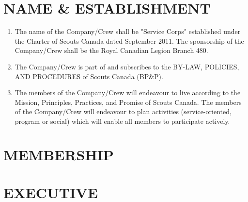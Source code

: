 \documentclass{Service_Corps_Document}
\begin{document}
    \def \Title {Constitution}
    \def \Company {Service Corps}
    \def \versionNumber {4.3}
    \stdFooter
    \begin{titlepage}
        \stdTitlePage
    \end{titlepage}

    \tableofcontents

    \newpage


    \section{NAME \& ESTABLISHMENT}\label{sec:name-&-establishment}
    \begin{enumerate}
        \item The name of the Company/Crew shall be "Service Corps" established under the Charter of Scouts Canada dated September 2011.
        The sponsorship of the Company/Crew shall be the Royal Canadian Legion Branch 480.
        \item The Company/Crew is part of and subscribes to the BY-LAW, POLICIES, AND PROCEDURES of Scouts Canada (BP\&P).
        \item The members of the Company/Crew will endeavour to live according to the Mission, Principles, Practices, and Promise of Scouts Canada.
        The members of the Company/Crew will endeavour to plan activities (service-oriented, program or social) which will enable all members to participate actively.
    \end{enumerate}


    \section{MEMBERSHIP}\label{sec:membership}
    


    \section{EXECUTIVE}\label{sec:executive}
    
\end{document}

